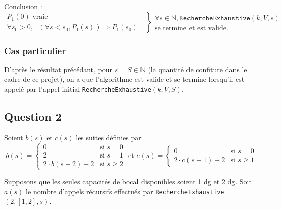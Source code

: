 \documentclass[12pt,a4paper]{article}
\begin{document}
\medskip
\underline{Conclusion} : 
\begin{equation*}
\left .\begin{array}{l}
P_{1}(0) \text{ vraie } \\
\forall s_0 > 0, [(\forall s < s_0, P_{1}(s)) \Rightarrow P_{1}(s_0) ]
\end{array} \right \}
\left .\begin{array}{l}
\forall s \in \mathbb{N}, \texttt{RechercheExhaustive}(k,V,s) \\
\text{se termine et est valide.}
\end{array}\right .
\end{equation*}

\subsubsection*{Cas particulier}
D'apr\`es le r\'esultat pr\'ec\'edant, pour $s = S \in \mathbb{N}$ (la quantit\'e de confiture dans le cadre de ce projet), on a que l'algorithme est valide et se termine lorsqu'il est appel\'e par l'appel initial \texttt{RechercheExhaustive}$(k,V,S)$. 

\subsection*{Question 2}
Soient $b(s)$ et $c(s)$ les suites d\'efinies par
\begin{equation*}
\left .b(s) = \begin{cases} 
      0 & \text{si } s = 0 \\
      2 & \text{si } s = 1 \\
      2\cdot b(s-2) + 2 & \text{si } s\geq 2 
   \end{cases} \right.
   \text{ et }
\left .c(s) = \begin{cases} 
      0 & \text{si } s = 0 \\
      2\cdot c(s-1) + 2 & \text{si } s\geq 1 
   \end{cases} \right.
\end{equation*}

Supposons que les seules capacit\'es de bocal disponibles soient 1 \si{dg} et 2 \si{dg}. Soit $a(s)$ le nombre d'appels r\'ecursifs effectu\'es par \texttt{RechercheExhaustive}$(2,[1,2],s)$.
\end{document}
